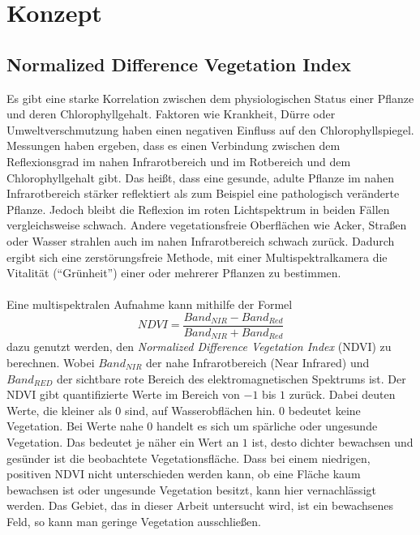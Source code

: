 

\chapter{Konzept}\label{chap:concept}

\section{Normalized Difference Vegetation Index}\label{sec:ndvi}

Es gibt eine starke Korrelation zwischen dem physiologischen Status einer Pflanze und deren Chlorophyllgehalt. Faktoren wie Krankheit, Dürre oder Umweltverschmutzung haben einen negativen Einfluss auf den Chlorophyllspiegel.\cite{ref:hendry} Messungen haben ergeben, dass es einen Verbindung zwischen dem Reflexionsgrad im nahen Infrarotbereich und im Rotbereich und dem Chlorophyllgehalt gibt. Das heißt, dass eine gesunde, adulte Pflanze im nahen Infrarotbereich stärker reflektiert als zum Beispiel eine pathologisch veränderte Pflanze. Jedoch bleibt die Reflexion im roten Lichtspektrum in beiden Fällen vergleichsweise schwach. Andere vegetationsfreie Oberflächen wie Acker, Straßen oder Wasser strahlen auch im nahen Infrarotbereich schwach zurück. Dadurch ergibt sich eine zerstörungsfreie Methode, mit einer Multispektralkamera die Vitalität ("`Grünheit"') einer oder mehrerer Pflanzen zu bestimmen.\cite{ref:anatoly} \\\\
Eine multispektralen Aufnahme kann mithilfe der Formel 
\begin{equation}\label{equation:ndvi}
	NDVI = \frac{Band_{NIR} - Band_{Red}} {Band_{NIR} + Band_{Red}}
\end{equation}
dazu genutzt werden, den \textit{Normalized Difference Vegetation Index} (NDVI) zu berechnen. Wobei $Band_{NIR}$ der nahe Infrarotbereich (Near Infrared) und $Band_{RED}$ der sichtbare rote Bereich des elektromagnetischen Spektrums ist. Der NDVI gibt quantifizierte Werte im Bereich von $-1$ bis $1$ zurück. Dabei deuten Werte, die kleiner als $0$ sind, auf Wasserobflächen hin. $0$ bedeutet keine Vegetation. Bei Werte nahe $0$ handelt es sich um spärliche oder ungesunde Vegetation. Das bedeutet je näher ein Wert an $1$ ist, desto dichter bewachsen und gesünder ist die beobachtete Vegetationsfläche.\cite{ref:nasa} Dass bei einem niedrigen, positiven NDVI nicht unterschieden werden kann, ob eine Fläche kaum bewachsen ist oder ungesunde Vegetation besitzt, kann hier vernachlässigt werden. Das Gebiet, das in dieser Arbeit untersucht wird, ist ein bewachsenes Feld, so kann man geringe Vegetation ausschließen. 


